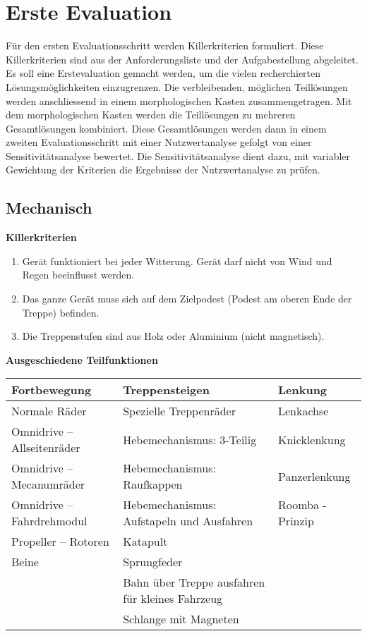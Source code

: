 \section{Erste Evaluation}

Für den ersten Evaluationsschritt werden Killerkriterien formuliert. Diese Killerkriterien sind aus der Anforderungsliste und der Aufgabestellung abgeleitet. Es soll eine Erstevaluation gemacht werden, um die vielen recherchierten Lösungsmöglichkeiten einzugrenzen. Die verbleibenden, möglichen Teillösungen werden anschliessend in einem morphologischen Kasten zusammengetragen. Mit dem morphologischen Kasten werden die Teillösungen zu mehreren Gesamtlösungen kombiniert. Diese Gesamtlösungen werden dann in einem zweiten Evaluationsschritt mit einer Nutzwertanalyse gefolgt von einer Sensitivitätsanalyse bewertet. Die Sensitivitätsanalyse dient dazu, mit variabler Gewichtung der Kriterien die Ergebnisse der Nutzwertanalyse zu prüfen.

\subsection{Mechanisch}
\textbf{Killerkriterien}
\begin{enumerate} 
	\item Gerät funktioniert bei jeder Witterung. Gerät darf nicht von Wind und Regen beeinflusst werden.
	\item Das ganze Gerät muss sich auf dem Zielpodest (Podest am oberen Ende der Treppe) befinden.
	\item Die Treppenstufen sind aus Holz oder Aluminium (nicht magnetisch).
\end{enumerate}

\textbf{Ausgeschiedene Teilfunktionen}

\begin{longtable}[h]{l|l|l}
\textbf{Fortbewegung} & \textbf{Treppensteigen} & \textbf{Lenkung} 
\tabularnewline
\endhead
Normale Räder & Spezielle Treppenräder & Lenkachse 
\tabularnewline
Omnidrive – Allseitenräder & Hebemechanismus: 3-Teilig & Knicklenkung 
\tabularnewline
Omnidrive – Mecanumräder & Hebemechanismus: Raufkappen & Panzerlenkung 
\tabularnewline
Omnidrive – Fahrdrehmodul & Hebemechanismus: Aufstapeln und Ausfahren & Roomba - Prinzip 
\tabularnewline
\cellcolor{red} Propeller – Rotoren & \cellcolor{red} Katapult & 
\tabularnewline
Beine & Sprungfeder &
\tabularnewline
 & \cellcolor{red} Bahn über Treppe ausfahren für kleines Fahrzeug & 
\tabularnewline
 & \cellcolor{red} Schlange mit Magneten & 
\end{longtable}


